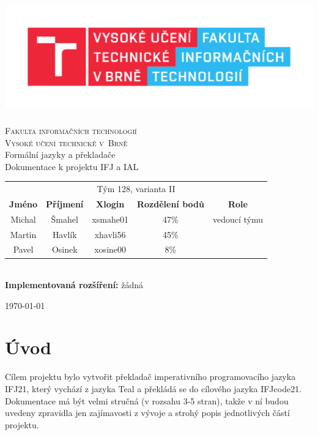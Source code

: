 \documentclass[11pt,a4paper]{article}
\begin{document}
\begin{titlepage}
    \begin{center}
        \includegraphics[height = 160pt]{images/FIT_logo.pdf}\\
		
		{\Huge \textsc{Fakulta informačních technologií}\\[5pt]}
		{\Huge \textsc{Vysoké učení technické v~Brně}}\\
		{\LARGE Formální jazyky a překladače\\[5pt]}
		{\LARGE Dokumentace k projektu IFJ a IAL\\[30pt]}
		
		\begin{tabular}{c c c c c}
		    \multicolumn{5}{c}{Tým 128, varianta II}\\[5pt]
            \textbf{Jméno} & \textbf{Příjmení} & \textbf{Xlogin} & \textbf{Rozdělení bodů} & \textbf{Role}\\
            \hline
            Michal & Šmahel & xsmahe01 & 47\% & vedoucí týmu \\[5pt]
            Martin & Havlík & xhavli56 & 45\% &\\[5pt]
            Pavel  & Osinek & xosine00 & 8\% & 
        \end{tabular}\\[30pt]
        \textbf{Implementovaná rozšíření:} žádná
    \end{center}
    {
		\hfill
		\today
	}
\end{titlepage}

\newpage
\tableofcontents
\newpage

\section{Úvod}
Cílem projektu bylo vytvořit překladač imperativního programovacího jazyka IFJ21, který vychází z jazyka Teal a překládá se do cílového jazyka IFJcode21. Dokumentace má být velmi stručná (v rozsahu 3-5 stran), takže v ní budou uvedeny zpravidla jen zajímavosti z vývoje a strohý popis jednotlivých částí projektu.
        
\end{document}
